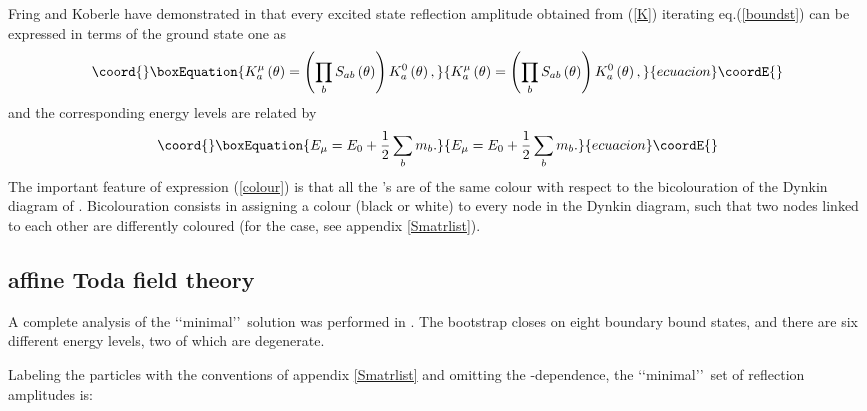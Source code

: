 \documentclass[a4paper,12pt]{report}
\begin{document}
Fring and Koberle have demonstrated in \cite{fring2} that every excited state reflection amplitude obtained from
(\ref{K}) iterating eq.(\ref{boundst}) can be expressed in terms of the ground state one as
\begin{equation}\coord{}\boxEquation{\label{colour}
K_{a}^{\mu}\left(\theta\right)=\left(\prod_{b}S_{ab}\left(\theta\right)\right)K_{a}^{0}\left(\theta\right),
}{K_{a}^{\mu}\left(\theta\right)=\left(\prod_{b}S_{ab}\left(\theta\right)\right)K_{a}^{0}\left(\theta\right),
}{ecuacion}\coordE{}\end{equation}
and the corresponding energy levels are related by
\begin{equation}\coord{}\boxEquation{\label{level}
E_{\mu}=E_{0}+\frac{1}{2}\sum_{b}m_{b}.
}{E_{\mu}=E_{0}+\frac{1}{2}\sum_{b}m_{b}.
}{ecuacion}\coordE{}\end{equation}
The important feature of expression (\ref{colour}) is that all the \coordHE{}'s are of the same colour with respect to
the bicolouration of the Dynkin diagram of \coordHE{}. Bicolouration consists in assigning a colour (black or white) to
every node in the Dynkin diagram, such that two nodes linked to each other are differently coloured (for the
\coordHE{} case, see appendix \ref{Smatrlist}).


\subsection{\coordHE{} affine Toda field theory}

A complete analysis of the \lq\lq minimal\rq\rq \, solution was performed in \cite{fring2}. The bootstrap closes
on eight boundary bound states, and there are six different energy levels, two of which are degenerate.

Labeling the particles with the conventions of appendix \ref{Smatrlist} and omitting the \myHighlight{$\theta$}\coordHE{}-dependence, the
\lq\lq minimal\rq\rq \, set of reflection amplitudes is:
\end{document}
